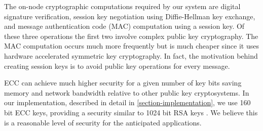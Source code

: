 
The on-node cryptographic computations required by our system are digital signature
verification, session key negotiation using Diffie-Hellman key exchange, and message
authentication code (MAC) computation using a session key. Of these three operations the first
two involve complex public key cryptography. The MAC computation occurs much more frequently but
is much cheaper since it uses hardware accelerated symmetric key cryptography. In fact, the
motivation behind creating session keys is to avoid public key operations for every message.

ECC can achieve much higher security for a given number of key bits saving memory and network
bandwidth relative to other public key cryptosystems. In our implementation, described in detail
in \autoref{section-implementation}, we use 160 bit ECC keys, providing a security similar to
1024 bit RSA keys \cite{lenstra-verheul-2001}. We believe this is a reasonable level of security
for the anticipated applications.
